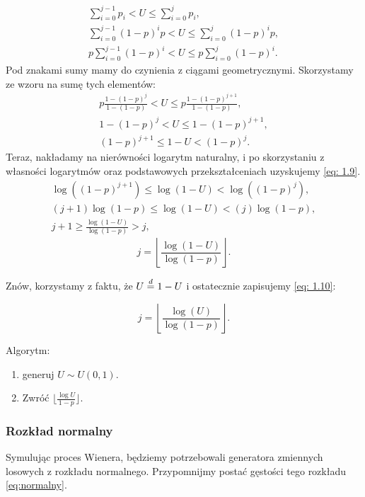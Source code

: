 \documentclass{article}
\theoremstyle{break}
\numberwithin{equation}{subsection}
\numberwithin{figure}{section}
\begin{document}
\begin{gather}
    \sum_{i=0}^{j-1}p_i<U\leq\sum_{i=0}^{j}p_i,\\
    \sum_{i=0}^{j-1}(1-p)^ip<U\leq\sum_{i=0}^{j}(1-p)^ip,\\
    p\sum_{i=0}^{j-1}(1-p)^i<U\leq p\sum_{i=0}^{j}(1-p)^i.
\end{gather}
Pod znakami sumy mamy do czynienia z ciągami geometrycznymi. Skorzystamy ze wzoru na sumę tych elementów:
\begin{gather}
    p\frac{1-(1-p)^{j}}{1-(1-p)}<U\leq p\frac{1-(1-p)^{j+1}}{1-(1-p)},\\
    1-(1-p)^{j} <U\leq 1-(1-p)^{j+1},\\
    (1-p)^{j+1}\leq 1-U<(1-p)^{j}.
\end{gather}
Teraz, nakładamy na nierówności logarytm naturalny, i po skorzystaniu z własności logarytmów oraz podstawowych przekształceniach uzyskujemy \eqref{eq: 1.9}.
\begin{gather}
    \log((1-p)^{j+1})\leq \log(1-U)<\log((1-p)^{j}),\\
    (j+1)\log(1-p)\leq \log(1-U)<(j)\log(1-p),\\
    j+1\geq\frac{\log(1-U)}{\log(1-p)}>j,
\end{gather}
\begin{equation}
    j=\left \lfloor{\frac{\log(1-U)}{\log(1-p)}}\right \rfloor. \label{eq: 1.9}
\end{equation}

Znów, korzystamy z faktu, że $U \buildrel d \over =1- U$ i ostatecznie zapisujemy \eqref{eq: 1.10}:

\begin{equation}
 j=\left \lfloor{\frac{\log(U)}{\log(1-p)}}\right \rfloor. \label{eq: 1.10}
\end{equation}

Algorytm:

\begin{enumerate}
\item generuj $U \sim U(0, 1)$.
\item Zwróć $\lfloor{\frac{\log{U}}{1-p}}\rfloor$.
\end{enumerate}

\subsubsection{Rozkład normalny}

Symulując proces Wienera, będziemy potrzebowali generatora zmiennych losowych z rozkładu normalnego. Przypomnijmy postać gęstości tego rozkładu \eqref{eq:normalny}.
\end{document}
